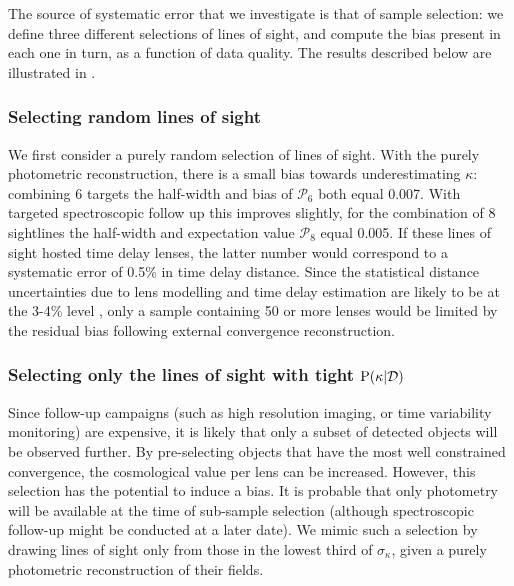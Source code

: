 \documentclass[useAMS,usenatbib]{mn2e}
\begin{document}
The source of systematic error that we investigate  is that of sample
selection: we define three different selections of lines of sight, and compute
the bias present in each one in turn, as a function of data quality. The
results described below are illustrated in .


\subsubsection{Selecting random lines of sight}
\label{sec:bias:random}

We first consider a purely random selection of lines of sight. With the purely
photometric reconstruction, there is a small bias towards underestimating
$\kappa$: combining 6 targets the half-width and bias of $\mathcal{P}_{6}$
both equal 0.007. With targeted spectroscopic follow up this improves
slightly, for the combination of 8 sightlines the half-width and expectation
value  $\mathcal{P}_{8}$ equal 0.005.  If these lines of sight hosted time
delay lenses, the latter number would correspond to a systematic error of
0.5\% in time delay distance. Since the statistical distance uncertainties due
to lens modelling and time delay estimation are likely to be at the 3-4\%
level \citep{SuyuEtal2010},  only a sample containing 50 or more lenses would
be limited by the residual bias  following external convergence
reconstruction.


\subsubsection{Selecting only the lines of sight with tight ${\rm P}(\kappa|{\mathcal{D}})$}
\label{sec:bias:tightPDF}

Since follow-up campaigns (such as high resolution imaging, or time
variability monitoring) are expensive, it is likely that only a subset of
detected objects will be observed further. By pre-selecting objects that have 
the most well constrained convergence, the cosmological value per lens can be
increased. However, this selection has the potential to induce a bias. It is
probable that only photometry will be available at the time of sub-sample
selection (although spectroscopic follow-up might be conducted at a later
date). We mimic such a selection by drawing lines of sight only from those in
the lowest third of $\sigma_{\kappa}$, given a purely photometric
reconstruction of their fields. 
\end{document}
